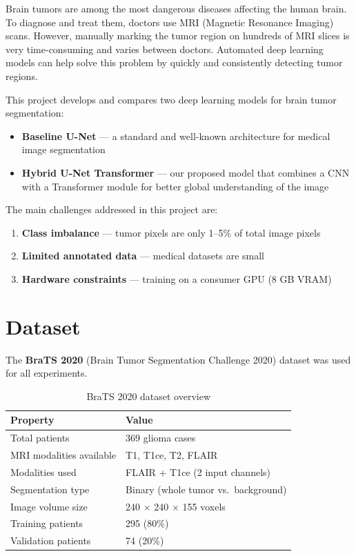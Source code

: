 \documentclass[12pt, a4paper]{article}
\begin{document}
Brain tumors are among the most dangerous diseases affecting the human brain. To diagnose and treat them, doctors use MRI (Magnetic Resonance Imaging) scans. However, manually marking the tumor region on hundreds of MRI slices is very time-consuming and varies between doctors. Automated deep learning models can help solve this problem by quickly and consistently detecting tumor regions.

This project develops and compares two deep learning models for brain tumor segmentation:

\begin{itemize}
    \item \textbf{Baseline U-Net} — a standard and well-known architecture for medical image segmentation
    \item \textbf{Hybrid U-Net Transformer} — our proposed model that combines a CNN with a Transformer module for better global understanding of the image
\end{itemize}

The main challenges addressed in this project are:
\begin{enumerate}
    \item \textbf{Class imbalance} — tumor pixels are only 1--5\% of total image pixels
    \item \textbf{Limited annotated data} — medical datasets are small
    \item \textbf{Hardware constraints} — training on a consumer GPU (8 GB VRAM)
\end{enumerate}

\section{Dataset}

The \textbf{BraTS 2020} (Brain Tumor Segmentation Challenge 2020) dataset was used for all experiments.

\begin{table}[H]
    \centering
    \caption{BraTS 2020 dataset overview}
    \begin{tabular}{ll}
        \toprule
        \textbf{Property} & \textbf{Value} \\
        \midrule
        Total patients & 369 glioma cases \\
        MRI modalities available & T1, T1ce, T2, FLAIR \\
        Modalities used & FLAIR + T1ce (2 input channels) \\
        Segmentation type & Binary (whole tumor vs.\ background) \\
        Image volume size & 240 $\times$ 240 $\times$ 155 voxels \\
        Training patients & 295 (80\%) \\
        Validation patients & 74 (20\%) \\
        \bottomrule
    \end{tabular}
\end{table}
\end{document}
